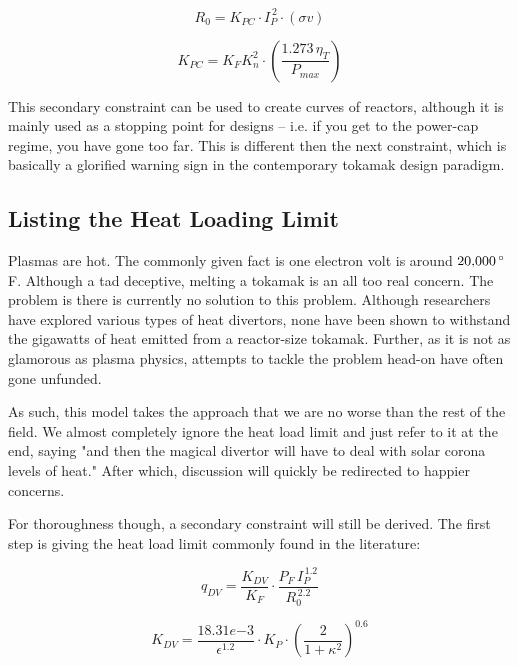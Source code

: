 \begin{equation}
	R_0 = K_{PC} \cdot I_P^{\,2} \cdot (\sigma v)
\end{equation}

\begin{equation}
	K_{PC} = K_F K_n^2 \cdot \left( \frac{ 1.273 \, \eta_T }{ P_{max} } \right)
\end{equation}

This secondary constraint can be used to create curves of reactors, although it is mainly used as a stopping point for designs -- i.e. if you get to the power-cap regime, you have gone too far. This is different then the next constraint, which is basically a glorified warning sign in the contemporary tokamak design paradigm.

\subsection{Listing the Heat Loading Limit}

Plasmas are hot. The commonly given fact is one electron volt is around $20\textnormal{,}000 \, {}^\circ$F. Although a tad deceptive, melting a tokamak is an all too real concern. The problem is there is currently no solution to this problem. Although researchers have explored various types of heat divertors, none have been shown to withstand the gigawatts of heat emitted from a reactor-size tokamak. Further, as it is not as glamorous as plasma physics, attempts to tackle the problem head-on have often gone unfunded.

As such, this model takes the approach that we are no worse than the rest of the field. We almost completely ignore the heat load limit and just refer to it at the end, saying "and then the magical divertor will have to deal with solar corona levels of heat." After which, discussion will quickly be redirected to happier concerns.

For thoroughness though, a secondary constraint will still be derived. The first step is giving the heat load limit commonly found in the literature:

\begin{equation}
  q_{DV} = \frac{ K_{DV} }{ K_F} \cdot \frac{ P_F \, I_P^{\,1.2} }{ R_0^{\,2.2} }
\end{equation}

\begin{equation}
	K_{DV} = \frac{18.31e{-3}}{\epsilon^{1.2}} \cdot K_P \cdot \left( \frac{2}{1+\kappa^2} \right) ^ {0.6}
\end{equation}

